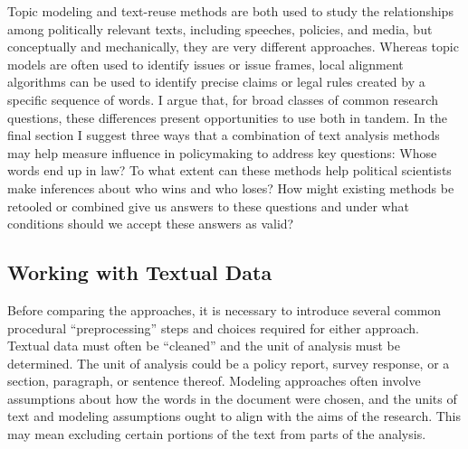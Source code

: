 \documentclass{article}
\begin{document}
Topic modeling and text-reuse methods are both used to study the relationships among politically relevant texts, including speeches, policies, and media, but conceptually and mechanically, they are very different approaches. Whereas topic models are often used to identify issues or issue frames, local alignment algorithms can be used to identify precise claims or legal rules created by a specific sequence of words. I argue that, for broad classes of common research questions, these differences present opportunities to use both in tandem. In the final section I suggest three ways that a combination of text analysis methods may help measure influence in policymaking to address key questions: Whose words end up in law? To what extent can these methods help political scientists make inferences about who wins and who loses? How might existing methods be retooled or combined give us answers to these questions and under what conditions should we accept these answers as valid?

\subsection{Working with Textual Data}
Before comparing the approaches, it is necessary to introduce several common procedural ``preprocessing'' steps and choices required for either approach. Textual data must often be ``cleaned'' and the unit of analysis must be determined. The unit of analysis could be a policy report, survey response, or a section, paragraph, or sentence thereof. Modeling approaches often involve assumptions about how the words in the document were chosen, and the units of text and modeling assumptions ought to align with the aims of the research.  This may mean excluding certain portions of the text from parts of the analysis.
\end{document}
